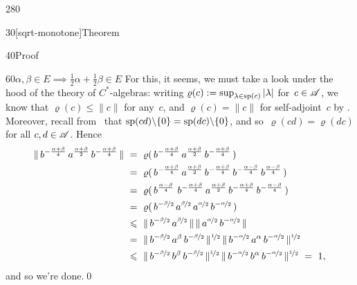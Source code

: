 \begin{parsec}{280}
\begin{point}{30}[sqrt-monotone]{Theorem}
\begin{point}{40}{Proof}
\begin{point}{60}{$\alpha,\beta\in E\implies \frac{1}{2}\alpha+\frac{1}{2}\beta
	\in E$}
For this, it seems, we must take a look under the hood
of the theory of $C^*$-algebras:
writing $\varrho(c):=\sup_{\lambda\in \mathrm{sp}(c)}\left|\lambda \right|$
for~$c\in \mathscr{A}$,
we know that $\varrho(c)\leq \|c\|$ for any~$c$,
and $\varrho(c)=\|c\|$ for self-adjoint~$c$ by .
Moreover, recall from~
that $\mathrm{sp}(cd)\backslash\{0\}
=\mathrm{sp}(dc)\backslash\{0\}$,
and so~$\varrho(cd)=\varrho(dc)$
for all $c,d\in \mathscr{A}$.
Hence
\begin{alignat*}{3}
\|\,b^{-\frac{\alpha+\beta}{4}}\,a^{\frac{\alpha+\beta}{2}}\,
b^{-\frac{\alpha+\beta}{4}}\,\| 
\ &=\ 
\varrho(\,b^{-\frac{\alpha+\beta}{4}}\,a^{\frac{\alpha+\beta}{2}}\,
b^{-\frac{\alpha+\beta}{4}} \,) \\
&=\ 
\varrho(\,b^{-\frac{\alpha+\beta}{4}}\,a^{\frac{\alpha+\beta}{2}}\,
b^{-\frac{\alpha+\beta}{4}} \,b^{-\frac{\alpha-\beta}{4}}
\,b^{\frac{\alpha-\beta}{4}}\,) \\
&=\ 
\varrho(
\,b^{\frac{\alpha-\beta}{4}}\,
\,b^{-\frac{\alpha+\beta}{4}}\,a^{\frac{\alpha+\beta}{2}}\,
b^{-\frac{\alpha+\beta}{4}} \,b^{-\frac{\alpha-\beta}{4}}\,)\\
&=\ 
\varrho(
\,b^{-\nicefrac{\beta}{2}}\,a^{\nicefrac{\beta}{2}}\,
a^{\nicefrac{\alpha}{2}}\,
b^{-\nicefrac{\alpha}{2}} \,) \\
&\leq\ 
\|\,b^{-\nicefrac{\beta}{2}}\,a^{\nicefrac{\beta}{2}}\,\|
\,\|\,
a^{\nicefrac{\alpha}{2}}\,
b^{-\nicefrac{\alpha}{2}} \,\|\\
&=\ 
\|\,b^{-\nicefrac{\beta}{2}}\,a^{\beta}\,
b^{-\nicefrac{\beta}{2}}\,\|^{\nicefrac{1}{2}}
\,\|\,
b^{-\nicefrac{\alpha}{2}} \,a^\alpha\,
b^{-\nicefrac{\alpha}{2}} \,\|^{\nicefrac{1}{2}}\\
\ &\leq\ 
\|\,b^{-\nicefrac{\beta}{2}}\,b^{\beta}\,
b^{-\nicefrac{\beta}{2}}\,\|^{\nicefrac{1}{2}}
\,\|\,
b^{-\nicefrac{\alpha}{2}} \,b^\alpha\,
b^{-\nicefrac{\alpha}{2}} \,\|^{\nicefrac{1}{2}} \ = \ 1,
\end{alignat*}
and so we're done.\qed
\end{point}
\end{point}
\end{point}
\end{parsec}

